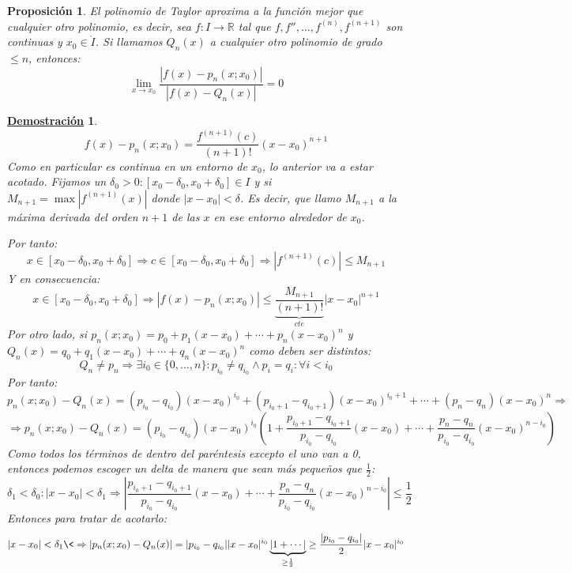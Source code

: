 \documentclass[10pt,a4paper,openright]{book}
\theoremstyle{break}
\newtheorem{prop}{Proposición}[chapter]
\newtheorem*{demo}{\underline{Demostración}}
\begin{document}
\begin{prop}
El polinomio de Taylor aproxima a la función mejor que cualquier otro polinomio, es decir, sea $f: I\rightarrow\mathbb R$ tal que $f, f'', ..., f^{(n)}, f^{(n+1)}$ son continuas y $x_0\in \mathring{I}$. Si llamamos $Q_n(x)$ a cualquier otro polinomio de grado $\leq n$, entonces:
$$\lim_{x\rightarrow x_0}\frac{|f(x)-p_n(x;x_0)|}{|f(x)-Q_n(x)|}=0$$\end{prop}
\begin{demo}
$$f(x)-p_n(x;x_0)=\frac{f^{(n+1)}(c)}{(n+1)!}(x-x_0)^{n+1}$$
Como en particular es continua en un entorno de $x_0$, lo anterior va a estar acotado. Fijamos un $\delta_0>0 : [x_0-\delta_0, x_0+\delta_0]\in I$ y si $M_{n+1}=\max |f^{(n+1)}(x)|$ donde $|x-x_0|<\delta$. Es decir, que llamo $M_{n+1}$ a la máxima derivada del orden $n+1$ de las $x$ en ese entorno alrededor de $x_0$. 

Por tanto:
$$x\in [x_0-\delta_0, x_0+\delta_0]\Rightarrow c\in [x_0-\delta_0, x_0+\delta_0] \Rightarrow |f^{(n+1)}(c)|\leq M_{n+1}$$
Y en consecuencia:
$$x\in [x_0-\delta_0, x_0+\delta_0]\Rightarrow |f(x)-p_n(x;x_0)|\leq \underbrace{\frac{M_{n+1}}{(n+1)!}}_{cte}|x-x_0|^{n+1}$$
Por otro lado, si $p_n(x;x_0)=p_0+p_1(x-x_0)+\cdots +p_n(x-x_0)^n$ y $Q_n(x)=q_0+q_1(x-x_0)+\cdots +q_n(x-x_0)^n$ como deben ser distintos:
$$Q_n\neq p_n\Rightarrow \exists i_0\in \{0, ..., n\}: p_{i_0}\neq q_{i_0}\wedge p_i=q_i:\forall i < i_0$$
Por tanto:
$$p_n(x;x_0)-Q_n(x)=(p_{i_0}-q_{i_0})(x-x_0)^{i_0}+(p_{i_0+1}-q_{i_0+1})(x-x_0)^{i_0+1}+\cdots + (p_n-q_n)(x-x_0)^{n}\Rightarrow $$
$$\Rightarrow p_n(x;x_0)-Q_n(x)=(p_{i_0}-q_{i_0})(x-x_0)^{i_0}\left( 1+ \frac{p_{i_0+1}-q_{i_0+1}}{p_{i_0}-q_{i_0}}(x-x_0)+\cdots + \frac{p_n-q_n}{p_{i_0}-q_{i_0}}(x-x_0)^{n-i_0}\right)$$
Como todos los términos de dentro del paréntesis excepto el uno van a 0, entonces podemos escoger un delta de manera que sean más pequeños que $\frac{1}{2}$:
$$\delta_1< \delta_0: |x-x_0|<\delta_1\Rightarrow \left| \frac{p_{i_0+1}-q_{i_0+1}}{p_{i_0}-q_{i_0}}(x-x_0)+\cdots + \frac{p_n-q_n}{p_{i_0}-q_{i_0}}(x-x_0)^{n-i_0}\right|\leq \frac{1}{2}$$
Entonces para tratar de acotarlo:
$$|x-x_0|<\delta_1\<\Rightarrow|p_n(x;x_0)-Q_n(x)|=|p_{i_0}-q_{i_0}||x-x_0|^{i_0}\underbrace{\left| 1 + \cdots \right|}_{\geq \frac{1}{2}}\geq \frac{|p_{i_0}-q_{i_0}|}{2}|x-x_0|^{i_0}$$


\end{demo}
\end{document}
